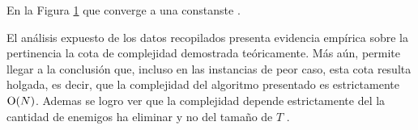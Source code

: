 	\begin{figure}[H]
		\centering
		\caption{}
		\label{fig:exp2:part_tiempo_base_var_T}
	\end{figure}

	En la Figura \ref{fig:exp2:part_tiempo_base_var_T} que converge a una constanste .

	 El análisis expuesto de los datos recopilados presenta evidencia empírica sobre la pertinencia la cota de complejidad demostrada teóricamente. Más aún, permite llegar a la conclusión que, incluso en las instancias de peor caso, esta cota resulta holgada, es decir, que la complejidad del algoritmo presentado es estrictamente $\operatorname{O}(N)$. Ademas se logro ver que la complejidad depende estrictamente del la cantidad de enemigos ha eliminar y no del tamaño de $T$ .



